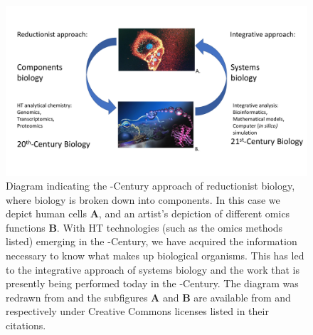 \begin{figure}[ht!]
    \centering
    \includegraphics[width=1.0\linewidth]{figure/background/systems.pdf}
    \caption[Diagram indicating the -Century approach of reductionist biology, where biology is broken down into components. In this case we depict human cells (\textbf{A}), and an artist's depiction of different omics functions (\textbf{B}). With \acrshort{HT} technologies (such as the omics methods listed) emerging in the -Century, we have acquired the information necessary to know what makes up biological organisms. This has led to the integrative approach of systems biology and the work that is presently being performed today in the -Century.]{Diagram indicating the -Century approach of reductionist biology, where biology is broken down into components. In this case we depict human cells \textbf{A}, and an artist's depiction of different omics functions \textbf{B}. With \acrshort{HT} technologies (such as the omics methods listed) emerging in the -Century, we have acquired the information necessary to know what makes up biological organisms. This has led to the integrative approach of systems biology and the work that is presently being performed today in the -Century. The diagram was redrawn from \citet{Palsson2000,Palsson2006} and the subfigures \textbf{A} and \textbf{B} are available from \citet{Vidal2013} and \citet{Rager2012} respectively under Creative Commons licenses listed in their citations.}
    \label{fig-intro-systems}
\end{figure}

